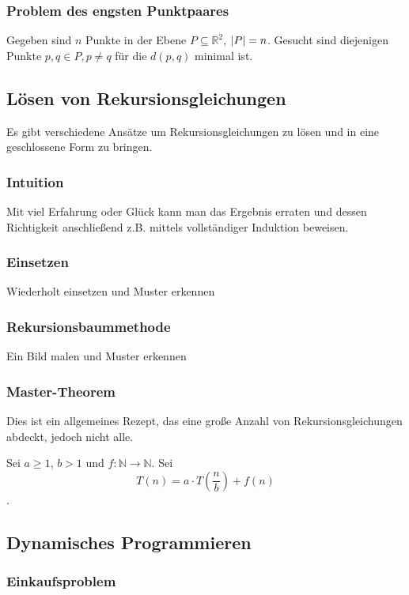 \subsubsection{Problem des engsten Punktpaares}

Gegeben sind $n$ Punkte in der Ebene $P \subseteq \mathbb{R}^2$, $\left|P\right| = n$.
Gesucht sind diejenigen Punkte $p, q \in P, p \neq q$ für die $d(p, q)$ minimal ist.

\subsection{Lösen von Rekursionsgleichungen}

Es gibt verschiedene Ansätze um Rekursionsgleichungen zu lösen und in eine geschlossene Form zu bringen.

\subsubsection{Intuition}
Mit viel Erfahrung oder Glück kann man das Ergebnis erraten und dessen
Richtigkeit anschließend z.B. mittels vollständiger Induktion beweisen.

\subsubsection{Einsetzen} Wiederholt einsetzen und Muster erkennen

\subsubsection{Rekursionsbaummethode} Ein Bild malen und Muster erkennen

\subsubsection{Master-Theorem}
Dies ist ein allgemeines Rezept, das eine große Anzahl von Rekursionsgleichungen
abdeckt, jedoch nicht alle.

Sei $a \geq 1$, $b > 1$ und $f: \mathbb{N} \rightarrow \mathbb{N}$. Sei
$$T(n) = a \cdot T(\frac{n}{b}) + f(n)$$.


\subsection{Dynamisches Programmieren}

\subsubsection{Einkaufsproblem}


